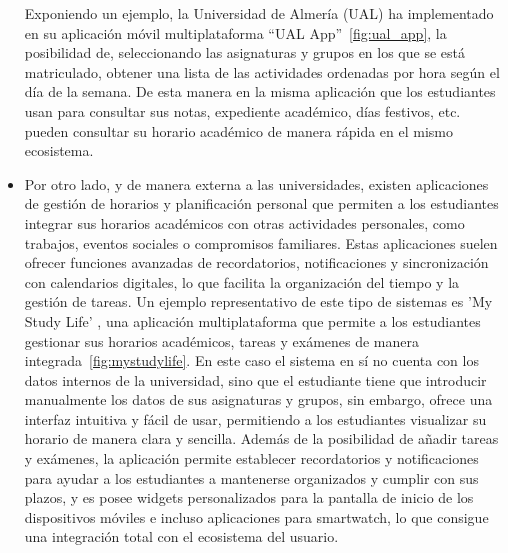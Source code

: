 \begin{itemize}
      Exponiendo un ejemplo, la Universidad de Almería (UAL) ha implementado en su aplicación móvil multiplataforma ``UAL App''~\ref{fig:ual_app}, la posibilidad de, seleccionando las asignaturas y grupos en los que se está matriculado, obtener
      una lista de las actividades ordenadas por hora según el día de la semana.
      \newline
      De esta manera en la misma aplicación que los estudiantes usan para consultar sus notas, expediente académico, días festivos, etc. pueden consultar su horario académico de manera rápida en el mismo ecosistema.

      \item Por otro lado, y de manera externa a las universidades, existen aplicaciones de gestión de horarios y planificación personal que permiten a los estudiantes integrar sus horarios académicos con otras actividades personales, como trabajos, eventos sociales o compromisos familiares. 
      \newline\newline
      Estas aplicaciones suelen ofrecer funciones avanzadas de recordatorios, notificaciones y sincronización con calendarios digitales, lo que facilita la organización del tiempo y la gestión de tareas.
      Un ejemplo representativo de este tipo de sistemas es 'My Study Life' \cite{webMyStudyLife}, una aplicación multiplataforma que permite a los estudiantes gestionar sus horarios académicos, tareas y exámenes de manera integrada~\ref{fig:mystudylife}. En este caso el sistema en sí no cuenta con los datos internos de la universidad, sino que el estudiante tiene que introducir manualmente los datos de sus asignaturas y grupos, sin embargo, ofrece una interfaz intuitiva y fácil de usar, permitiendo a los estudiantes visualizar su horario de manera clara y sencilla.
      Además de la posibilidad de añadir tareas y exámenes, la aplicación permite establecer recordatorios y notificaciones para ayudar a los estudiantes a mantenerse organizados y cumplir con sus plazos, y es posee widgets personalizados para la pantalla de inicio de los dispositivos móviles e incluso aplicaciones para smartwatch, lo que consigue una integración total con el ecosistema del usuario.


\end{itemize}
